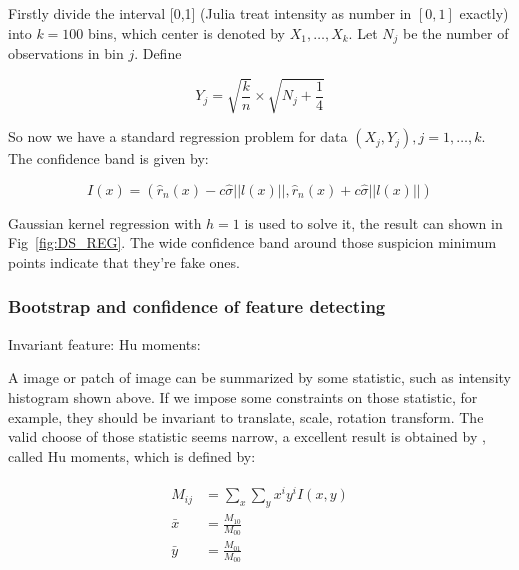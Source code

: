\documentclass{beamer}
\begin{document}
\begin{frame}

  Firstly divide the interval [0,1] (Julia treat intensity as number in $[0,1]$ exactly) into $k=100$ bins, 
  which center is denoted by $X_1,\dots,X_k$. Let $N_j$ be the number of observations in bin $j$. Define
  
  $$
  Y_j = \sqrt{\frac{k}{n}} \times \sqrt{N_j+\frac{1}{4}}
  $$
  
  So now we have a standard regression problem for data $(X_j,Y_j),j=1,\dots,k$. The confidence band is given by:

  $$
  I(x) = (\hat{r}_n(x)-c\hat{\sigma}||l(x)||, \hat{r}_n(x)+c\hat{\sigma}||l(x)||)
  $$

  Gaussian kernel regression with $h=1$ is used to solve it, the result can shown in Fig~\ref{fig:DS_REG}.
  The wide confidence band around those suspicion minimum points indicate that they're fake ones.
   

\end{frame}

\begin{frame}
  \frametitle{Bootstrap and confidence of feature detecting}

  Invariant feature: Hu moments:

  A image or patch of image can be summarized by some statistic, such as intensity histogram shown above. If we impose some constraints
  on those statistic, for example, they should be invariant to translate, scale, rotation transform. The valid choose of those statistic
  seems narrow, a excellent result is obtained by \cite{hu1962visual}, called Hu moments, which is defined by:
  
  \begin{align}
    \begin{split}
      M_{ij} &= \sum_x \sum_y x^i y^i I(x,y) \\
      \bar{x} &= \frac{M_{10}}{M_{00}} \\
      \bar{y} &= \frac{M_{01}}{M_{00}} \\
    \end{split} 
    \label{eq:mu_moment}
  \end{align}
\end{frame}
\end{document}
